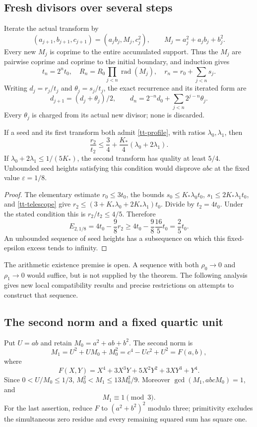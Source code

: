 \subsection{Fresh divisors over several steps}
Iterate the actual transform by
\[
 (a_{j+1},b_{j+1},c_{j+1})=(a_jb_j,M_j,c_j^2),\qquad
 M_j=a_j^2+a_jb_j+b_j^2.
\]
Every new $M_j$ is coprime to the entire accumulated support. Thus the
$M_j$ are pairwise coprime and coprime to the initial boundary, and induction
gives
\begin{equation}\label{tt-telescope}
 t_n=2^nt_0,\quad
 R_n=R_0\prod_{j<n}\operatorname{rad}(M_j),\quad
 r_n=r_0+\sum_{j<n}s_j.
\end{equation}
Writing $d_j=r_j/t_j$ and $\theta_j=s_j/t_j$, the exact recurrence and
its iterated form are
\[
 d_{j+1}=(d_j+\theta_j)/2,\qquad
 d_n=2^{-n}d_0+\sum_{j<n}2^{j-n}\theta_j.
\]
Every $\theta_j$ is charged from its actual new divisor; none is discarded.

\begin{theorem}\label{tt-two-step-criterion}
If a seed and its first transform both admit \eqref{tt-profile}, with ratios
$\lambda_0,\lambda_1$, then
\[
 \frac{r_2}{t_2}\le\frac34+
       \frac{K_*}4(\lambda_0+2\lambda_1).
\]
If $\lambda_0+2\lambda_1\le1/(5K_*)$, the second transform has quality
at least $5/4$. Unbounded seed heights satisfying this condition would
disprove $abc$ at the fixed value $\varepsilon=1/8$.
\end{theorem}
\begin{proof}
The elementary estimate $r_0\le3t_0$, the bounds
$s_0\le K_*\lambda_0t_0$, $s_1\le2K_*\lambda_1t_0$, and
\eqref{tt-telescope} give
$r_2\le(3+K_*\lambda_0+2K_*\lambda_1)t_0$.
Divide by $t_2=4t_0$. Under the stated condition this is
$r_2/t_2\le4/5$. Therefore
\[
 E_{2,1/8}=4t_0-\frac98r_2
 \ge4t_0-\frac98\frac{16}5t_0=\frac25t_0.
\]
An unbounded sequence of seed heights has a subsequence on which this
fixed-epsilon excess tends to infinity.
\end{proof}

The arithmetic existence premise is open. A sequence with both
$\rho_0\to0$ and $\rho_1\to0$ would suffice, but is not supplied by
the theorem. The following analysis gives new local compatibility results
and precise restrictions on attempts to construct that sequence.

\subsection{The second norm and a fixed quartic unit}
Put $U=ab$ and retain $M_0=a^2+ab+b^2$. The second norm is
\begin{equation}\label{tt-second-norm}
 M_1=U^2+UM_0+M_0^2=c^4-Uc^2+U^2=F(a,b),
\end{equation}
where
\[
 F(X,Y)=X^4+3X^3Y+5X^2Y^2+3XY^3+Y^4.
\]
Since $0<U/M_0\le1/3$,
$M_0^2<M_1\le13M_0^2/9$. Moreover
$\gcd(M_1,abcM_0)=1$, and
\begin{equation}\label{tt-second-mod-three}
 M_1\equiv1\pmod3.
\end{equation}
For the last assertion, reduce $F$ to $(a^2+b^2)^2$ modulo three; primitivity
excludes the simultaneous zero residue and every remaining squared sum has
square one.

